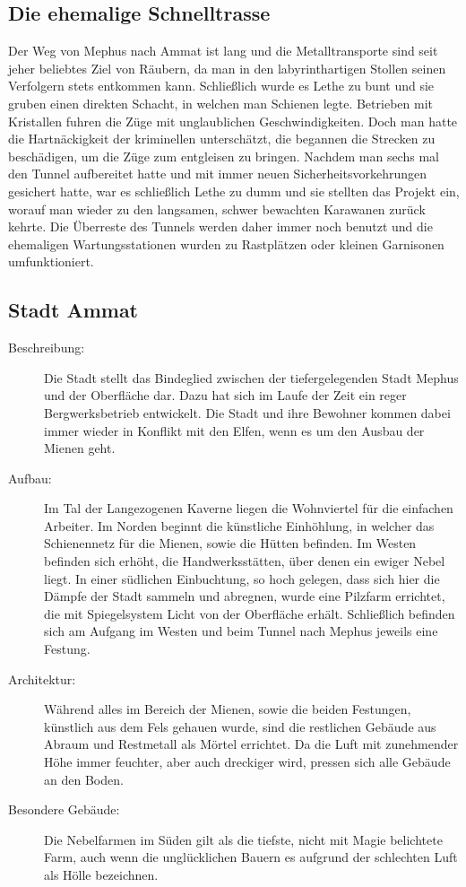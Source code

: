 \documentclass[a4paper,12pt,oneside]{book}
\begin{document}
\subsection{Die ehemalige Schnelltrasse}
Der Weg von Mephus nach Ammat ist lang und die Metalltransporte sind seit jeher beliebtes Ziel von Räubern, da man in den labyrinthartigen Stollen seinen Verfolgern stets entkommen kann. Schließlich wurde es Lethe zu bunt und sie gruben einen direkten Schacht, in welchen man Schienen legte. Betrieben mit Kristallen fuhren die Züge mit unglaublichen Geschwindigkeiten. Doch man hatte die Hartnäckigkeit der kriminellen unterschätzt, die begannen die Strecken zu beschädigen, um die Züge zum entgleisen zu bringen. Nachdem man sechs mal den Tunnel aufbereitet hatte und mit immer neuen Sicherheitsvorkehrungen gesichert hatte, war es schließlich Lethe zu dumm und sie stellten das Projekt ein, worauf man wieder zu den langsamen, schwer bewachten Karawanen zurück kehrte. Die Überreste des Tunnels werden daher immer noch benutzt und die ehemaligen Wartungsstationen wurden zu Rastplätzen oder kleinen Garnisonen umfunktioniert.

\subsection{Stadt Ammat}
\begin{description}
\item[Beschreibung:]Die Stadt stellt das Bindeglied zwischen der tiefergelegenden Stadt Mephus und der Oberfläche dar. Dazu hat sich im Laufe der Zeit ein reger Bergwerksbetrieb entwickelt. Die Stadt und ihre Bewohner kommen dabei immer wieder in Konflikt mit den Elfen, wenn es um den Ausbau der Mienen geht.
\item[Aufbau:]Im Tal der Langezogenen Kaverne liegen die Wohnviertel für die einfachen Arbeiter. Im Norden beginnt die künstliche Einhöhlung, in welcher das Schienennetz für die Mienen, sowie die Hütten befinden. Im Westen befinden sich erhöht, die Handwerksstätten, über denen ein ewiger Nebel liegt. In einer südlichen Einbuchtung, so hoch gelegen, dass sich hier die Dämpfe der Stadt sammeln und abregnen, wurde eine Pilzfarm errichtet, die mit Spiegelsystem Licht von der Oberfläche erhält. Schließlich befinden sich am Aufgang im Westen und beim Tunnel nach Mephus jeweils eine Festung.
\item[Architektur:]Während alles im Bereich der Mienen, sowie die beiden Festungen, künstlich aus dem Fels gehauen wurde, sind die restlichen Gebäude aus Abraum und Restmetall als Mörtel errichtet. Da die Luft mit zunehmender Höhe immer feuchter, aber auch dreckiger wird, pressen sich alle Gebäude an den Boden.
\item[Besondere Gebäude:] Die Nebelfarmen im Süden gilt als die tiefste, nicht mit Magie belichtete Farm, auch wenn die unglücklichen Bauern es aufgrund der schlechten Luft als Hölle bezeichnen.
\end{description}
\end{document}
